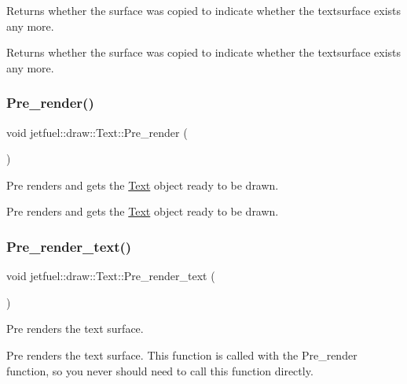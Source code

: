 Returns whether the surface was copied to indicate whether the textsurface exists any more. 

Returns whether the surface was copied to indicate whether the textsurface exists any more. \mbox{\label{classjetfuel_1_1draw_1_1Text_ae25b3503ec6fcf36aaeebf4e08612394}} 
\subsubsection{\texorpdfstring{Pre\+\_\+render()}{Pre\_render()}}
{\footnotesize\ttfamily void jetfuel\+::draw\+::\+Text\+::\+Pre\+\_\+render (\begin{DoxyParamCaption}{ }\end{DoxyParamCaption})\hspace{0.3cm}{\ttfamily [protected]}}



Pre renders and gets the \hyperlink{classjetfuel_1_1draw_1_1Text}{Text} object ready to be drawn. 

Pre renders and gets the \hyperlink{classjetfuel_1_1draw_1_1Text}{Text} object ready to be drawn. \mbox{\label{classjetfuel_1_1draw_1_1Text_a5ce2072f87c6e02dfbc363e1c489cc3b}} 
\subsubsection{\texorpdfstring{Pre\+\_\+render\+\_\+text()}{Pre\_render\_text()}}
{\footnotesize\ttfamily void jetfuel\+::draw\+::\+Text\+::\+Pre\+\_\+render\+\_\+text (\begin{DoxyParamCaption}{ }\end{DoxyParamCaption})\hspace{0.3cm}{\ttfamily [protected]}}



Pre renders the text surface. 

Pre renders the text surface. This function is called with the Pre\+\_\+render function, so you never should need to call this function directly. \mbox{\label{classjetfuel_1_1draw_1_1Text_af1eaae041e0f763a95ca6e87aa7c3d7e}} 
